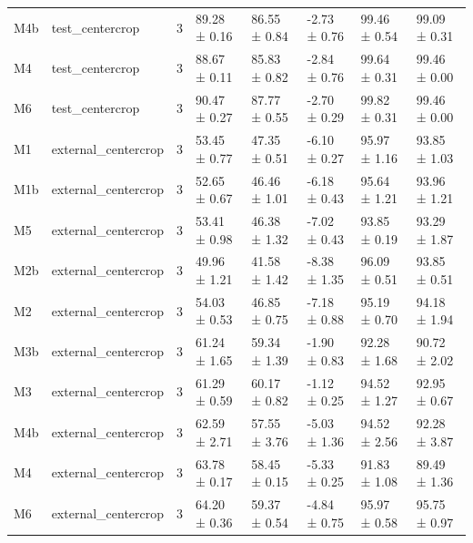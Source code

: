 \begin{tabular}{llrlllll}
M4b & test\_centercrop & 3 & 89.28 ± 0.16 & 86.55 ± 0.84 & -2.73 ± 0.76 & 99.46 ± 0.54 & 99.09 ± 0.31 \\
M4 & test\_centercrop & 3 & 88.67 ± 0.11 & 85.83 ± 0.82 & -2.84 ± 0.76 & 99.64 ± 0.31 & 99.46 ± 0.00 \\
M6 & test\_centercrop & 3 & 90.47 ± 0.27 & 87.77 ± 0.55 & -2.70 ± 0.29 & 99.82 ± 0.31 & 99.46 ± 0.00 \\
M1 & external\_centercrop & 3 & 53.45 ± 0.77 & 47.35 ± 0.51 & -6.10 ± 0.27 & 95.97 ± 1.16 & 93.85 ± 1.03 \\
M1b & external\_centercrop & 3 & 52.65 ± 0.67 & 46.46 ± 1.01 & -6.18 ± 0.43 & 95.64 ± 1.21 & 93.96 ± 1.21 \\
M5 & external\_centercrop & 3 & 53.41 ± 0.98 & 46.38 ± 1.32 & -7.02 ± 0.43 & 93.85 ± 0.19 & 93.29 ± 1.87 \\
M2b & external\_centercrop & 3 & 49.96 ± 1.21 & 41.58 ± 1.42 & -8.38 ± 1.35 & 96.09 ± 0.51 & 93.85 ± 0.51 \\
M2 & external\_centercrop & 3 & 54.03 ± 0.53 & 46.85 ± 0.75 & -7.18 ± 0.88 & 95.19 ± 0.70 & 94.18 ± 1.94 \\
M3b & external\_centercrop & 3 & 61.24 ± 1.65 & 59.34 ± 1.39 & -1.90 ± 0.83 & 92.28 ± 1.68 & 90.72 ± 2.02 \\
M3 & external\_centercrop & 3 & 61.29 ± 0.59 & 60.17 ± 0.82 & -1.12 ± 0.25 & 94.52 ± 1.27 & 92.95 ± 0.67 \\
M4b & external\_centercrop & 3 & 62.59 ± 2.71 & 57.55 ± 3.76 & -5.03 ± 1.36 & 94.52 ± 2.56 & 92.28 ± 3.87 \\
M4 & external\_centercrop & 3 & 63.78 ± 0.17 & 58.45 ± 0.15 & -5.33 ± 0.25 & 91.83 ± 1.08 & 89.49 ± 1.36 \\
M6 & external\_centercrop & 3 & 64.20 ± 0.36 & 59.37 ± 0.54 & -4.84 ± 0.75 & 95.97 ± 0.58 & 95.75 ± 0.97 \\
\bottomrule
\end{tabular}
